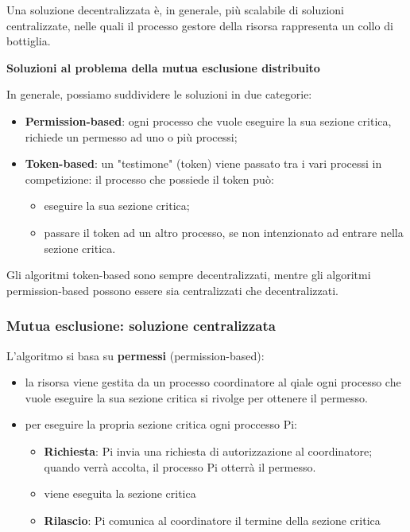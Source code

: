 \documentclass{article}
\begin{document}
Una soluzione decentralizzata è, in generale, più scalabile di soluzioni centralizzate, nelle quali il processo gestore della risorsa rappresenta un collo di bottiglia.

\vspace{5mm}
\textbf{Soluzioni al problema della mutua esclusione distribuito}

\vspace{3mm}
In generale, possiamo suddividere le soluzioni in due categorie:
\begin{itemize}
    \item \textbf{Permission-based}: ogni processo che vuole eseguire la sua sezione critica, richiede un permesso ad uno o più processi;
    \item \textbf{Token-based}: un "testimone" (token) viene passato tra i vari processi in competizione: il processo che possiede il token può:
    \begin{itemize}
        \item eseguire la sua sezione critica;
        \item passare il token ad un altro processo, se non intenzionato ad entrare nella sezione critica.
    \end{itemize}
\end{itemize}

\vspace{3mm}
Gli algoritmi token-based sono sempre decentralizzati, mentre gli algoritmi permission-based possono essere sia centralizzati che decentralizzati.

\subsubsection{Mutua esclusione: soluzione centralizzata}

L'algoritmo si basa su \textbf{permessi} (permission-based):
\begin{itemize}
    \item la risorsa viene gestita da un processo coordinatore al qiale ogni processo che vuole eseguire la sua sezione critica si rivolge per ottenere il permesso.
    \item per eseguire la propria sezione critica ogni proccesso Pi:
    \begin{itemize}
        \item \textbf{Richiesta}: Pi invia una richiesta di autorizzazione al coordinatore; quando verrà accolta, il processo Pi otterrà il permesso.
        \item viene eseguita la sezione critica
        \item \textbf{Rilascio}: Pi comunica al coordinatore il termine della sezione critica
    \end{itemize}
\end{itemize}
\end{document}
